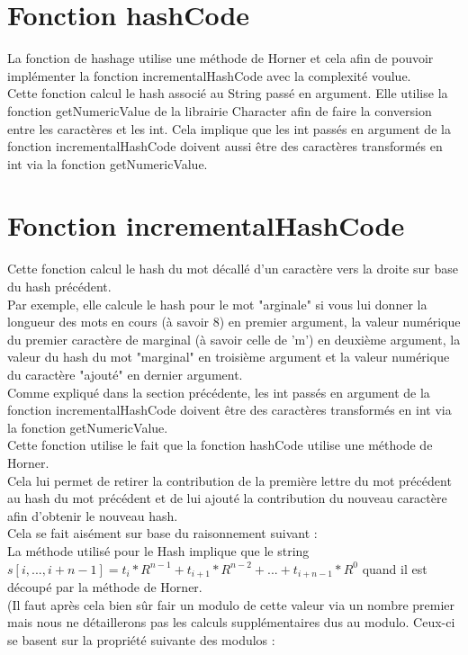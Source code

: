 \documentclass[11pt, frenchb]{article}
\begin{document}
\section{Fonction hashCode}
La fonction de hashage utilise une méthode de Horner et cela afin de pouvoir implémenter la fonction incrementalHashCode avec la complexité voulue.\\
Cette fonction calcul le hash associé au String passé en argument. Elle utilise la fonction getNumericValue de la librairie Character afin de faire la conversion entre les caractères et les int. Cela implique que les int passés en argument de la fonction incrementalHashCode doivent aussi être des caractères transformés en int via la fonction getNumericValue.

\section{Fonction incrementalHashCode}
Cette fonction calcul le hash du mot décallé d'un caractère vers la droite sur base du hash précédent.\\
Par exemple, elle calcule le hash pour le mot "arginale" si vous lui donner la longueur des mots en cours (à savoir 8) en premier argument, la valeur numérique du premier caractère de marginal (à savoir celle de 'm') en deuxième argument, la valeur du hash du mot "marginal" en troisième argument et la valeur numérique du caractère "ajouté" en dernier argument.\\ 
Comme expliqué dans la section précédente, les int passés en argument de la fonction incrementalHashCode doivent être des caractères transformés en int via la fonction getNumericValue.\\
Cette fonction utilise le fait que la fonction hashCode utilise une méthode de Horner.\\Cela lui permet de retirer la contribution de la première lettre du mot précédent au hash du mot précédent et de lui ajouté la contribution du nouveau caractère afin d'obtenir le nouveau hash.\\
Cela se fait aisément sur base du raisonnement suivant :\\
La méthode utilisé pour le Hash implique que le string $ s[i,..., i+n-1] = t_i*R^{n-1} + t_{i+1}*R^{n-2}+...+t_{i+n-1}*R^0 $ quand il est découpé par la méthode de Horner.\\
(Il faut après cela bien sûr fair un modulo de cette valeur via un nombre premier 
mais nous ne détaillerons pas les calculs supplémentaires dus au modulo. Ceux-ci se basent sur la propriété suivante des modulos :\\
\end{document}
